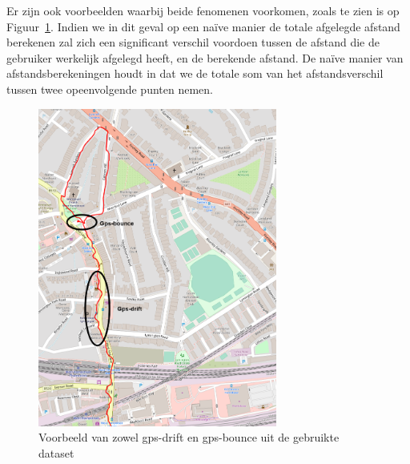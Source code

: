 Er zijn ook voorbeelden waarbij beide fenomenen voorkomen, zoals te zien is op
Figuur~\ref{fig:gps_drift_bounce_Strava}. Indien we in dit geval op een naïve
manier de totale afgelegde afstand berekenen zal zich een significant verschil
voordoen tussen de afstand die de gebruiker werkelijk afgelegd heeft, en de
berekende afstand. De naïve manier van afstandsberekeningen houdt in dat we de
totale som van het afstandsverschil tussen twee opeenvolgende punten nemen.
\begin{figure}
    \centering
    \includegraphics[width=0.7\textwidth]{fig/Afwijkingen&Analyses/Crooked Routes/1_notSnapped.png}
    \caption{Voorbeeld van zowel gps-drift en gps-bounce uit de gebruikte dataset}\label{fig:gps_drift_bounce_Strava}
\end{figure}

